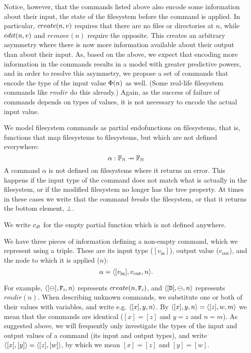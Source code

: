 Notice, however, that the commands listed above also encode some information about 
their input, the state of the filesystem
before the command is applied. In particular, $create(n,v)$ requires that there are no files
or directories at $n$, while $edit(n,v)$ and $remove(n)$ require the opposite.
This creates an arbitrary asymmetry where
there is now more information available about their output than about their input.
As, based on the above, we expect that encoding more information in the commands
results in a model with greater predictive powers,
and in order to resolve this asymmetry, 
we propose a set of commands that encode
the type of the input value $\Phi(n)$ as well.
(Some real-life filesystem commands like $rmdir$ do this already.)
Again, as the success of failure of commands depends on types of values,
it is not necessary to encode the actual input value.


\begin{mydef}
We model filesystem commands as partial endofunctions on filesystems,
that is, functions that map filesystems to filesystems, but which
are not defined everywhere:
\[ \alpha: \mathbb{F}_{\mathbb{N}} \nrightarrow \mathbb{F}_{\mathbb{N}} \]
A command $\alpha$ is not defined on filesystems where it returns an error.
This happens if the input type of the command does not match
what is actually in the filesystem, or if the modified filesystem no
longer has the tree property.
At times in these cases we write that the command {\em breaks} the filesystem,
or that it returns the bottom element, $\bot$.

We write $c_\varnothing$ for the empty partial function which is not defined anywhere.

We have three pieces of information defining a non-empty command,
which we represent using a triple. These are its
input type ($[v_\textrm{in}]$), output value ($v_\textrm{out}$),
and the node to which it is applied ($n$):
\[ \alpha = \langle{[v_\textrm{in}],v_\textrm{out},n}\rangle. \]
\end{mydef}

For example, $\langle{[\ominus],\mathtt{F}_i,n}\rangle$ represents $create(n,\mathtt{F}_i)$,
and $\langle{[\mathtt{D}],\ominus,n}\rangle$ represents $rmdir(n)$.
When describing unknown commands, we substitute one or both
of their values with variables, and write e.g. $\langle{[x],y,n}\rangle$.
By $\langle{[x],y,n}\rangle=\langle{[z],w,m}\rangle$ we mean that the commands are identical
($[x]=[z]$ and $y=z$ and $n=m$).
As suggested above, we will frequently only investigate
the types of the input and output values of a command
(its input and output types), and write
$\langle{[x],[y]}\rangle=\langle{[z],[w]}\rangle$, by which we mean $[x]=[z]$ and $[y]=[w]$.

